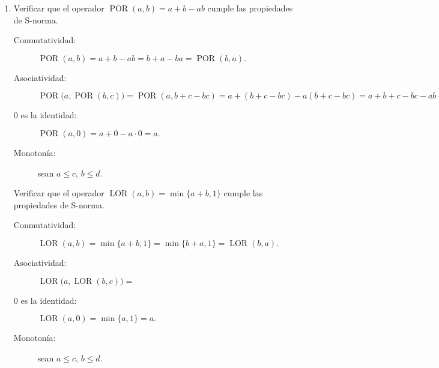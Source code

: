 \documentclass{article}
\DeclareMathOperator{\LOR} {LOR}
\DeclareMathOperator{\POR} {POR}
\begin{document}
\begin{enumerate}[
  label=\arabic*.,
  font=\LARGE\bfseries,%
  labelindent=-.5in,%
  leftmargin=0pt,%
  labelsep=1em%
]
  \item[1-ii.]
    Verificar que el operador \(\POR(a, b) = a + b - ab\)
    cumple las propiedades de S-norma.
    \begin{description}
      \item[Conmutatividad:]
        \(
          \POR(a, b) =
          a + b - ab =
          b + a - ba =
          \POR(b, a).
        \)
      \item[Asociatividad:]
        \(
          \POR\bigl(a, \POR(b, c)\bigr) =
          \POR(a, b + c - bc) =
          a + (b + c - bc) - a(b + c - bc) =
          a + b + c - bc - ab - ac - abc =
          (a + b - ab) + c - (a + b - ab)c =
          \POR(a + b - ab, c) =
          \POR\bigl(\POR(a, b), c\bigr).
        \)
      \item[0 es la identidad:]
        \(
          \POR(a, 0) = a + 0 - a\cdot 0 = a.
        \)
      \item[Monotonía:] sean \(a\le c\), \(b\le d\).
    \end{description}

    Verificar que el operador \(\LOR(a, b) = \min\{a + b, 1\}\)
    cumple las propiedades de S-norma.
    \begin{description}
      \item[Conmutatividad:]
        \(
          \LOR(a, b) =
          \min\{a + b, 1\} =
          \min\{b + a, 1\} =
          \LOR(b, a).
        \)
      \item[Asociatividad:]
        \(
          \LOR\bigl(a, \LOR(b, c)\bigr) =
        \)
      \item[0 es la identidad:]
        \(
          \LOR(a, 0) =
          \min\{a, 1\} =
          a.
        \)
      \item[Monotonía:] sean \(a\le c\), \(b\le d\).
    \end{description}
\end{enumerate}
\end{document}
